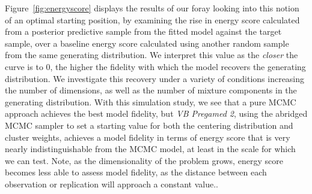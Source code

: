 Figure~\ref{fig:energyscore} displays the results of our foray looking into this 
    notion of an optimal starting position, by examining the rise in energy score 
    calculated from a posterior predictive sample from the fitted model against the target 
    sample, over a baseline energy score calculated using another random sample from the same 
    generating distribution.  We interpret this value as the \emph{closer} the curve is to 0, 
    the higher the fidelity with which the model recovers the generating distribution.  
    We investigate this recovery under a variety of conditions increasing the number of dimensions,
    as well as the number of mixture components in the generating distribution. With this simulation
    study, we see that
    a pure MCMC approach achieves the best model fidelity, but \emph{VB Pregamed 2}, using 
    the abridged MCMC sampler to set a starting value for both the centering distribution 
    and cluster weights, achieves a model fidelity in terms of energy score that is very
    nearly indistinguishable from the MCMC model, at least in the scale for which we can test.
    Note, as the dimensionality of the problem grows, energy score becomes less able to assess 
    model fidelity, as the distance between each observation or replication will approach a 
    constant value..

